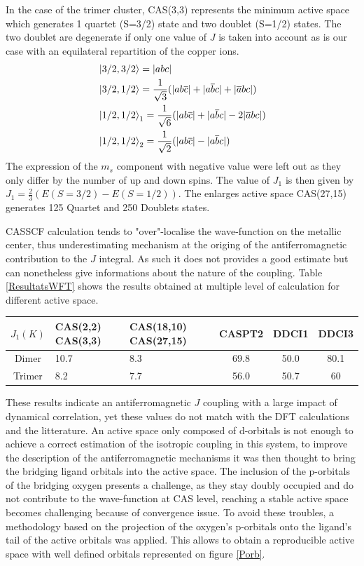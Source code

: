\documentclass[10pt]{report}
\numberwithin{equation}{section}
\begin{document}
In the case of the trimer cluster, CAS(3,3) represents the minimum active space which generates 1 quartet (S=3/2) state and two doublet (S=1/2) states. The two doublet are degenerate if only one value of $J$ is taken into account as is our case with an equilateral repartition of the copper ions.
\begin{align}
    &\ket{3/2,3/2}=|abc|\\
    &\ket{3/2,1/2}=\frac{1}{\sqrt{3}}(|ab\overline{c}|+|a\overline{b}c|+|\overline{a}bc|)\\
    &\ket{1/2,1/2}_1=\frac{1}{\sqrt{6}}(|ab\overline{c}|+|a\overline{b}c|-2|\overline{a}bc|)\\
    &\ket{1/2,1/2}_2=\frac{1}{\sqrt{2}}(|ab\overline{c}|-|a\overline{b}c|)
\end{align}
The expression of the $m_s$ component with negative value were left out as they only differ by the number of up and down spins.
The value of $J_1$ is then given by $J_1=\frac{2}{3}(E(S=3/2)-E(S=1/2))$.
The enlarges active space CAS(27,15) generates 125 Quartet and 250 Doublets states.

CASSCF calculation tends to "over"-localise the wave-function on the metallic center, thus underestimating mechanism at the origing of the antiferromagnetic contribution to the $J$ integral.
As such it does not provides a good estimate but can nonetheless give informations about the nature of the coupling.
Table \ref{ResultatsWFT} shows the results obtained at multiple level of calculation for different active space.

\begin{center}\label{ResultatsWFT}
    \begin{tabular}{c m{8em} m{10em} c c c }
        \hline
        $J_1 (K)$ & CAS(2,2) CAS(3,3) & CAS(18,10) CAS(27,15) & CASPT2 & DDCI1  & DDCI3  \\
        \hline
        Dimer & 10.7 & 8.3 & 69.8 & 50.0 & 80.1 \\
        Trimer & 8.2 & 7.7 & 56.0  & 50.7 & 60 \\
        \hline
    \end{tabular}
\end{center}

These results indicate an antiferromagnetic $J$ coupling with a large impact of dynamical correlation, yet these values do not match with the DFT calculations and the litterature.
An active space only composed of d-orbitals is not enough to achieve a correct estimation of the isotropic coupling in this system, to improve the description of the antiferromagnetic mechanisms it was then thought to bring the bridging ligand orbitals into the active space.
The inclusion of the p-orbitals of the bridging oxygen presents a challenge, as they stay doubly occupied and do not contribute to the wave-function at CAS level, reaching a stable active space becomes challenging because of convergence issue.
To avoid these troubles, a methodology based on the projection of the oxygen's p-orbitals onto the ligand's tail of the active orbitals was applied.
This allows to obtain a reproducible active space with well defined orbitals represented on figure \ref{Porb}.
\end{document}
